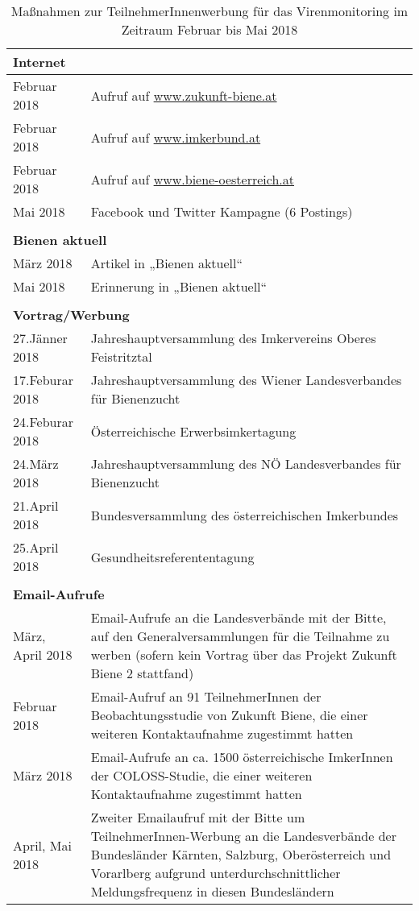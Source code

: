 
\begin{table}[htp]
    \caption{Maßnahmen zur TeilnehmerInnenwerbung für das Virenmonitoring im Zeitraum Februar bis Mai 2018}
    \centering
    \begin{tabular}{l|p{13cm}}
    \multicolumn{2}{l}{\textbf{Internet}} \\
    \hline
    Februar 2018  & Aufruf auf \url{www.zukunft-biene.at} \\
    Februar 2018  & Aufruf auf \url{www.imkerbund.at} \\ 
    Februar 2018  & Aufruf auf \url{www.biene-oesterreich.at} \\ 
    Mai 2018      & Facebook und Twitter Kampagne (6 Postings) \\ 
    
    \multicolumn{2}{l}{\textbf{}} \\
    \multicolumn{2}{l}{\textbf{Bienen aktuell}} \\
    \hline
    März 2018     & Artikel in „Bienen aktuell“ \\ 
    Mai 2018      & Erinnerung in „Bienen aktuell“ \\ 
    
    \multicolumn{2}{l}{\textbf{}} \\
    \multicolumn{2}{l}{\textbf{Vortrag/Werbung}} \\
    \hline
    27.Jänner 2018    & Jahreshauptversammlung des Imkervereins Oberes Feistritztal \\
    17.Feburar 2018   & Jahreshauptversammlung des Wiener Landesverbandes für Bienenzucht \\ 
    24.Feburar 2018   & Österreichische Erwerbsimkertagung \\
    24.März 2018      & Jahreshauptversammlung des NÖ Landesverbandes für Bienenzucht \\
    21.April 2018     & Bundesversammlung des österreichischen Imkerbundes \\
    25.April 2018     & Gesundheitsreferententagung \\
    
    \multicolumn{2}{l}{\textbf{}} \\
    \multicolumn{2}{l}{\textbf{Email-Aufrufe}} \\
    \hline
    
    März, April 2018 & Email-Aufrufe an die Landesverbände mit der Bitte, auf den Generalversammlungen für die Teilnahme zu werben (sofern kein Vortrag über das Projekt Zukunft Biene 2 stattfand) \\
    Februar 2018 & Email-Aufruf an 91 TeilnehmerInnen der Beobachtungsstudie von Zukunft Biene, die einer weiteren Kontaktaufnahme zugestimmt hatten\\
    März 2018 & Email-Aufrufe an ca. 1500 österreichische ImkerInnen der COLOSS-Studie, die einer weiteren Kontaktaufnahme zugestimmt hatten\\
    April, Mai 2018 & Zweiter Emailaufruf mit der Bitte um TeilnehmerInnen-Werbung an die Landesverbände der Bundesländer Kärnten, Salzburg, Oberösterreich und Vorarlberg aufgrund unterdurchschnittlicher Meldungsfrequenz in diesen Bundesländern \\
    
    \end{tabular}
    \label{tab:a:werbung}
\end{table}
